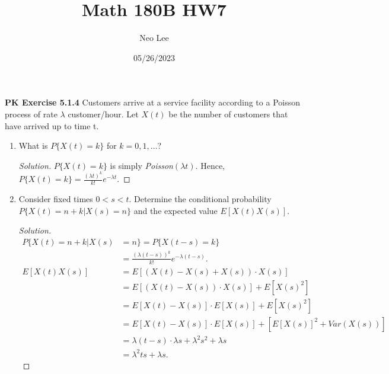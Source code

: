 \documentclass{article}
\title{Math 180B HW7}
\author{Neo Lee}
\date{05/26/2023}
\begin{document}
 

\maketitle 

\textbf{PK Exercise 5.1.4}
Customers arrive at a service facility according to a Poisson process of rate $\lambda$
customer/hour. Let $X(t)$ be the number of customers that have arrived up to time t.
\begin{enumerate}[label=(\alph*)]
    \item What is $P\{X(t) = k\}$ for $k = 0,1,\dots$?
    \begin{proof}[Solution]
        $P\{X(t)=k\}$ is simply \emph{Poisson}$(\lambda t)$.
        Hence, $P\{X(t)=k\} = \frac{(\lambda t)^k}{k!}e^{-\lambda t}$.
    \end{proof}

    \item Consider fixed times $0<s<t$. Determine the conditional probability
    $P\{X(t) = n + k|X(s) = n\}$ and the expected value $E[X(t)X(s)]$.
    \begin{proof}[Solution]
        \begin{align*}
            P\{X(t) = n + k|X(s) & = n\} = P\{X(t-s) = k\} \\
            & = \frac{(\lambda (t-s))^k}{k!}e^{-\lambda (t-s)}. \\
            E[X(t)X(s)] & = E[\left(X(t) - X(s) + X(s)\right)\cdot X(s)] \\
            & = E[(X(t) - X(s))\cdot X(s)] + E[X(s)^2] \\
            & = E[X(t) - X(s)]\cdot E[X(s)] + E[X(s)^2] \\
            & = E[X(t) - X(s)]\cdot E[X(s)] + \left[E[X(s)]^2 + Var(X(s))\right] \\
            & = \lambda(t-s)\cdot\lambda s + \lambda^2 s^2 + \lambda s \\
            & = \lambda^2 ts + \lambda s.
        \end{align*}
    \end{proof}
\end{enumerate}
\bigbreak
\end{document}
